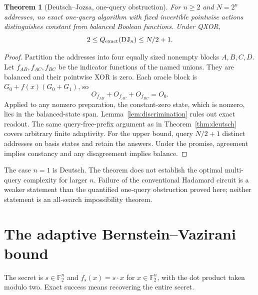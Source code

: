 \documentclass[11pt]{article}
\newtheorem{theorem}{Theorem}[section]
\newcommand{\F}{\mathbb F}
\begin{document}
\begin{theorem}[Deutsch--Jozsa, one-query obstruction]\label{thm:dj}
For $n\ge2$ and $N=2^n$ addresses, no exact one-query algorithm with fixed invertible pointwise actions distinguishes constant from balanced Boolean functions. Under QXOR,
\[
 2\le Q_{\rm exact}(\mathrm{DJ}_n)\le N/2+1.
\]
\end{theorem}
\begin{proof}
Partition the addresses into four equally sized nonempty blocks $A,B,C,D$. Let $f_{AB},f_{AC},f_{BC}$ be the indicator functions of the named unions. They are balanced and their pointwise XOR is zero. Each oracle block is $G_0+f(x)(G_0+G_1)$, so
\[
 O_{f_{AB}}+O_{f_{AC}}+O_{f_{BC}}=O_0.
\]
Applied to any nonzero preparation, the constant-zero state, which is nonzero, lies in the balanced-state span. Lemma~\ref{lem:discrimination} rules out exact readout. The same query-free-prefix argument as in Theorem~\ref{thm:deutsch} covers arbitrary finite adaptivity. For the upper bound, query $N/2+1$ distinct addresses on basis states and retain the answers. Under the promise, agreement implies constancy and any disagreement implies balance.
\end{proof}
The case $n=1$ is Deutsch. The theorem does not establish the optimal multi-query complexity for larger $n$. Failure of the conventional Hadamard circuit is a weaker statement than the quantified one-query obstruction proved here; neither statement is an all-search impossibility theorem.

\section{The adaptive Bernstein--Vazirani bound}
The secret is $s\in\F_2^n$ and $f_s(x)=s\cdot x$ for $x\in\F_2^n$, with the dot product taken modulo two. Exact success means recovering the entire secret.
\end{document}
